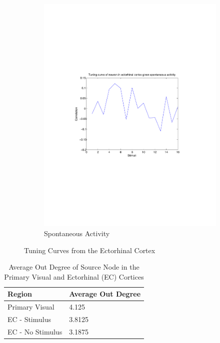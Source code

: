 \documentclass{article}
\begin{document}
\begin{figure}[ht]
\begin{subfigure}{0.45\textwidth}
    \includegraphics[width=\textwidth]{ECNeuronTuningCurve_Spont}
    \caption{Spontaneous Activity}
    \label{fig:spont_tuning}
  \end{subfigure}

  \caption{Tuning Curves from the Ectorhinal Cortex}
  \label{fig:ecto_tuning_curves}
\end{figure}

\begin{table}
  \centering

  \begin{tabular}{l|l}
    \hline
    Region           & Average Out Degree \\
    \hline
    Primary Visual   & 4.125              \\
    \hline 
    EC - Stimulus    & 3.8125             \\
    \hline
    EC - No Stimulus & 3.1875             \\ 
    \hline
  \end{tabular}

  \caption{Average Out Degree of Source Node in the Primary Visual and Ectorhinal (EC) Cortices}
  \label{tab:degrees}
\end{table}
\end{document}
